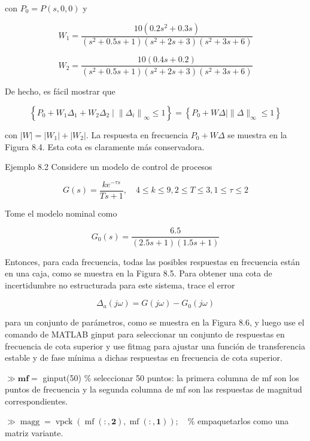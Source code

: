 con $P_{0}=P(s, 0,0)$ y

$$
W_{1}=\frac{10\left(0.2 s^{2}+0.3 s\right)}{\left(s^{2}+0.5 s+1\right)\left(s^{2}+2 s+3\right)\left(s^{2}+3 s+6\right)}
$$

$$
W_{2}=\frac{10(0.4 s+0.2)}{\left(s^{2}+0.5 s+1\right)\left(s^{2}+2 s+3\right)\left(s^{2}+3 s+6\right)}
$$

De hecho, es fácil mostrar que

$$
\left\{P_{0}+W_{1} \Delta_{1}+W_{2} \Delta_{2} \mid\left\|\Delta_{i}\right\|_{\infty} \leq 1\right\}=\left\{P_{0}+W \Delta \mid\|\Delta\|_{\infty} \leq 1\right\}
$$

con $|W|=\left|W_{1}\right|+\left|W_{2}\right|$. La respuesta en frecuencia $P_{0}+W \Delta$ se muestra en la Figura 8.4. Esta cota es claramente más conservadora.


Ejemplo 8.2 Considere un modelo de control de procesos

$$
G(s)=\frac{k e^{-\tau s}}{T s+1}, \quad 4 \leq k \leq 9,2 \leq T \leq 3,1 \leq \tau \leq 2
$$

Tome el modelo nominal como

$$
G_{0}(s)=\frac{6.5}{(2.5 s+1)(1.5 s+1)}
$$

Entonces, para cada frecuencia, todas las posibles respuestas en frecuencia están en una caja, como se muestra en la Figura 8.5. Para obtener una cota de incertidumbre no estructurada para este sistema, trace el error

$$
\Delta_{a}(j \omega)=G(j \omega)-G_{0}(j \omega)
$$

para un conjunto de parámetros, como se muestra en la Figura 8.6, y luego use el comando de MATLAB ginput para seleccionar un conjunto de respuestas en frecuencia de cota superior y use fitmag para ajustar una función de transferencia estable y de fase mínima a dichas respuestas en frecuencia de cota superior.


$\gg \mathbf{m f}=$ ginput(50) $\%$ seleccionar 50 puntos: la primera columna de $\mathrm{mf}$ son los puntos de frecuencia y la segunda columna de $\mathrm{mf}$ son las respuestas de magnitud correspondientes.

$\gg \operatorname{magg}=\operatorname{vpck}(\operatorname{mf}(:, \mathbf{2}), \operatorname{mf}(:, \mathbf{1})) ; \quad \%$ empaquetarlos como una matriz variante.

